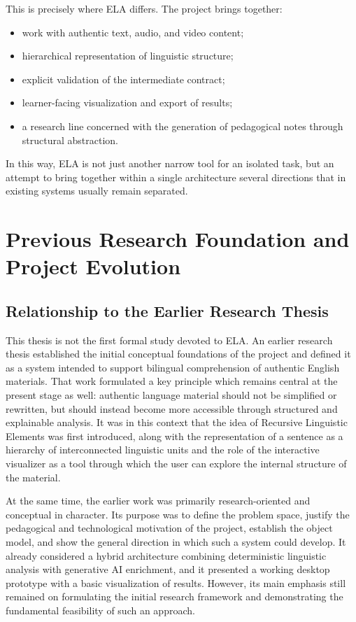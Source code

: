 \documentclass[12pt,a4paper,oneside]{report}
\begin{document}
This is precisely where ELA differs. The project brings together:
\begin{itemize}
  \item work with authentic text, audio, and video content;
  \item hierarchical representation of linguistic structure;
  \item explicit validation of the intermediate contract;
  \item learner-facing visualization and export of results;
  \item a research line concerned with the generation of pedagogical notes through structural abstraction.
\end{itemize}

In this way, ELA is not just another narrow tool for an isolated task, but an attempt to bring together within a single architecture several directions that in existing systems usually remain separated.

\chapter{Previous Research Foundation and Project Evolution}
\section{Relationship to the Earlier Research Thesis}
This thesis is not the first formal study devoted to ELA. An earlier research thesis established the initial conceptual foundations of the project and defined it as a system intended to support bilingual comprehension of authentic English materials. That work formulated a key principle which remains central at the present stage as well: authentic language material should not be simplified or rewritten, but should instead become more accessible through structured and explainable analysis. It was in this context that the idea of Recursive Linguistic Elements was first introduced, along with the representation of a sentence as a hierarchy of interconnected linguistic units and the role of the interactive visualizer as a tool through which the user can explore the internal structure of the material.

At the same time, the earlier work was primarily research-oriented and conceptual in character. Its purpose was to define the problem space, justify the pedagogical and technological motivation of the project, establish the object model, and show the general direction in which such a system could develop. It already considered a hybrid architecture combining deterministic linguistic analysis with generative AI enrichment, and it presented a working desktop prototype with a basic visualization of results. However, its main emphasis still remained on formulating the initial research framework and demonstrating the fundamental feasibility of such an approach.
\end{document}
